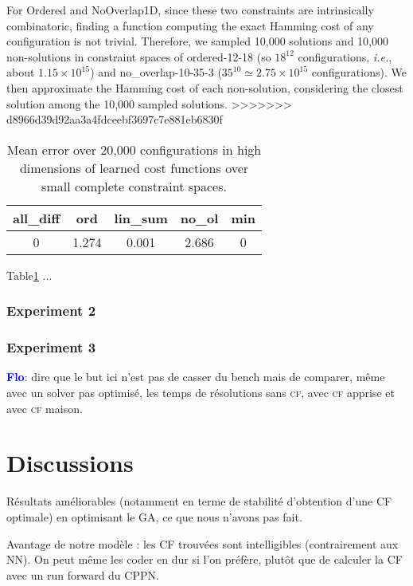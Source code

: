 \documentclass{article}
\newcommand{\ie}{\textit{i.e.}}
\newcommand{\cf}{\textsc{cf}\xspace}
\newcommand{\flo}{\textcolor{blue}{\bf Flo}\xspace}
\begin{document}
For  Ordered and  NoOverlap1D,  since these two constraints are intrinsically combinatoric, finding a function computing the exact Hamming cost of any configuration is not trivial.  Therefore,  we sampled 10,000 solutions and 10,000 non-solutions in constraint spaces of   ordered-12-18   (so    $18^{12}$   configurations,   \ie,   about $1.15\times         10^{15}$)          and         no\_overlap-10-35-3 ($35^{10}  \simeq   2.75\times  10^{15}$  configurations).    We then approximate the Hamming cost of each non-solution,  considering the closest solution among the 10,000 sampled solutions.
>>>>>>> d8966d39d92aa3a4fdceebf3697c7e881eb6830f

\begin{table}
  \centering
\begin{tabular}{|c|c|c|c|c|}
  \hline
  all\_diff & ord & lin\_sum & no\_ol & min\\
  \hline
  0 & 1.274 & 0.001 & 2.686 & 0\\
  \hline
\end{tabular}
\caption{Mean error  over 20,000 configurations in  high dimensions of
  learned cost functions over small complete constraint spaces.}
\label{tab:cf_scale}
\end{table}

Table\ref{tab:cf_scale} ...

\subsubsection{Experiment 2}

\subsubsection{Experiment 3}
\flo:  dire que  le but  ici  n'est pas  de  casser du  bench mais  de
comparer, même avec un solver  pas optimisé, les temps de résolutions
sans \cf, avec \cf apprise et avec \cf maison.

\section{Discussions}

Résultats améliorables  (notamment en  terme de  stabilité d'obtention
d'une CF optimale) en optimisant le GA, ce que nous n'avons pas fait.

Avantage  de  notre  modèle  :  les  CF  trouvées  sont  intelligibles
(contrairement aux NN). On peut même les coder en dur si l'on préfère,
plutôt que de calculer la CF avec un run forward du CPPN.
\end{document}

